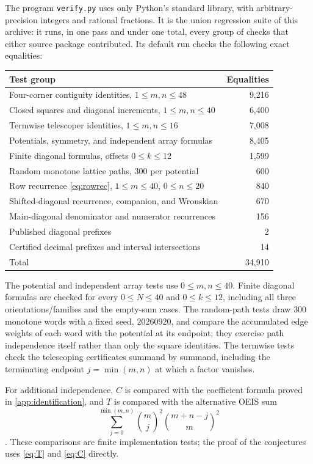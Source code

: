 \documentclass[11pt,letterpaper]{article}
\numberwithin{equation}{section}
\theoremstyle{definition}
\begin{document}
The program \texttt{verify.py} uses only Python's standard library, with
arbitrary-precision integers and rational fractions. It is the union
regression suite of this archive: it runs, in one pass and under one
total, every group of checks that either source package contributed.
Its default run checks the following exact equalities:
\begin{center}
\begin{tabular}{lr}
\toprule
Test group & Equalities\\
\midrule
Four-corner contiguity identities, $1\leq m,n\leq48$ &9,216\\
Closed squares and diagonal increments, $1\leq m,n\leq40$ &6,400\\
Termwise telescoper identities, $1\leq m,n\leq16$ &7,008\\
Potentials, symmetry, and independent array formulas &8,405\\
Finite diagonal formulas, offsets $0\leq k\leq12$ &1,599\\
Random monotone lattice paths, $300$ per potential &600\\
Row recurrence \eqref{eq:rowrec}, $1\leq m\leq40$, $0\leq n\leq20$ &840\\
Shifted-diagonal recurrence, companion, and Wronskian &670\\
Main-diagonal denominator and numerator recurrences &156\\
Published diagonal prefixes &2\\
Certified decimal prefixes and interval intersections &14\\
\midrule
Total &34,910\\
\bottomrule
\end{tabular}
\end{center}
The potential and independent array tests use $0\leq m,n\leq40$. Finite
diagonal formulas are checked for every $0\leq N\leq40$ and
$0\leq k\leq12$, including all three orientations/families and the
empty-sum cases. The random-path tests draw $300$ monotone words with a
fixed seed, $20260920$, and compare the accumulated edge weights of each
word with the potential at its endpoint; they exercise path independence
itself rather than only the square identities. The termwise tests check
the telescoping certificates summand by summand, including the
terminating endpoint $j=\min(m,n)$ at which a factor vanishes.

For additional independence, $C$ is compared with the coefficient
formula proved in \cref{app:identification}, and $T$ is compared with
the alternative OEIS sum
\[
 \sum_{j=0}^{\min(m,n)}\binom mj^2\binom{m+n-j}{m}^2
\]
\cite{oeis143007}. These comparisons are finite implementation tests;
the proof of the conjectures uses \eqref{eq:T} and \eqref{eq:C} directly.
\end{document}
